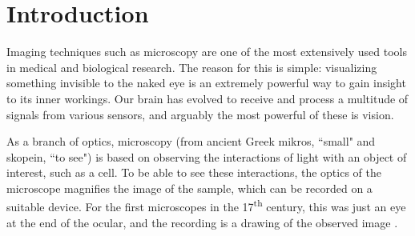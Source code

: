 

\chapter*{Introduction}








% 


Imaging techniques such as microscopy are one of the most extensively used tools in medical and biological research. The reason for this is simple: visualizing something invisible to the naked eye is an extremely powerful way to gain insight to its inner workings. Our brain has evolved to receive and process a multitude of signals from various sensors, and arguably the most powerful of these is vision.

As a branch of optics, microscopy (from ancient Greek mikros, ``small" and skopein, ``to see") is based on observing the interactions of light with an object of interest, such as a cell. To be able to see these interactions, the optics of the microscope magnifies the image of the sample, which can be recorded on a suitable device. For the first microscopes in the 17\textsuperscript{th} century, this was just an eye at the end of the ocular, and the recording is a drawing of the observed image \cite{hooke_micrographia:_1665}.

